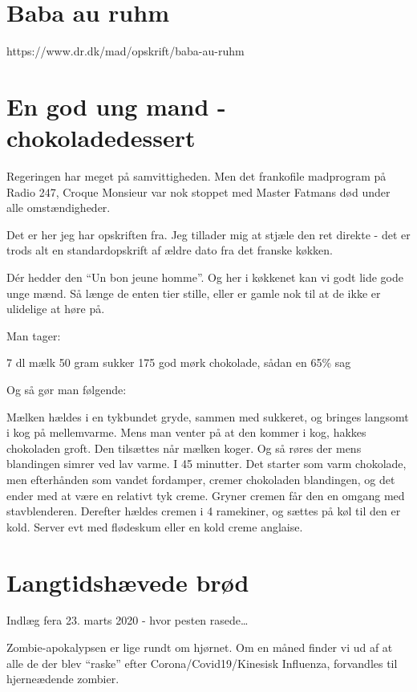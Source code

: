 \documentclass[
  letterpaper,
  DIV=11,
  numbers=noendperiod]{scrreprt}
\begin{document}
\hypertarget{baba-au-ruhm}{%
\section{Baba au ruhm}\label{baba-au-ruhm}}

https://www.dr.dk/mad/opskrift/baba-au-ruhm

\hypertarget{en-god-ung-mand---chokoladedessert}{%
\section{En god ung mand -
chokoladedessert}\label{en-god-ung-mand---chokoladedessert}}

Regeringen har meget på samvittigheden. Men det frankofile madprogram på
Radio 247, Croque Monsieur var nok stoppet med Master Fatmans død under
alle omstændigheder.

Det er her jeg har opskriften fra. Jeg tillader mig at stjæle den ret
direkte - det er trods alt en standardopskrift af ældre dato fra det
franske køkken.

Dér hedder den ``Un bon jeune homme''. Og her i køkkenet kan vi godt
lide gode unge mænd. Så længe de enten tier stille, eller er gamle nok
til at de ikke er ulidelige at høre på.

Man tager:

7 dl mælk 50 gram sukker 175 god mørk chokolade, sådan en 65\% sag

Og så gør man følgende:

Mælken hældes i en tykbundet gryde, sammen med sukkeret, og bringes
langsomt i kog på mellemvarme. Mens man venter på at den kommer i kog,
hakkes chokoladen groft. Den tilsættes når mælken koger. Og så røres der
mens blandingen simrer ved lav varme. I 45 minutter. Det starter som
varm chokolade, men efterhånden som vandet fordamper, cremer chokoladen
blandingen, og det ender med at være en relativt tyk creme. Gryner
cremen får den en omgang med stavblenderen. Derefter hældes cremen i 4
ramekiner, og sættes på køl til den er kold. Server evt med flødeskum
eller en kold creme anglaise.

\hypertarget{langtidshuxe6vede-bruxf8d}{%
\section{Langtidshævede brød}\label{langtidshuxe6vede-bruxf8d}}

Indlæg fera 23. marts 2020 - hvor pesten rasede\ldots{}

Zombie-apokalypsen er lige rundt om hjørnet. Om en måned finder vi ud af
at alle de der blev ``raske'' efter Corona/Covid19/Kinesisk Influenza,
forvandles til hjerneædende zombier.
\end{document}
